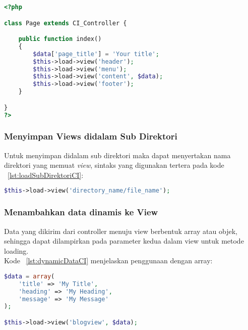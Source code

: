 \begin{lstlisting}[style=customphp, language=PHP, basicstyle=\ttfamily, frame=single, columns=fullflexible, keepspaces=true, breaklines=true, showstringspaces=false, label={lst:loadSomeViewCI}, caption=Contoh load beberapa view pada CodeIgniter.] 
<?php

class Page extends CI_Controller {

	public function index()
	{
		$data['page_title'] = 'Your title';
		$this->load->view('header');
		$this->load->view('menu');
		$this->load->view('content', $data);
		$this->load->view('footer');
	}

}
?>
\end{lstlisting}

\subsubsection{Menyimpan Views didalam Sub Direktori}
\label{ss:subdirektoriViewCI}
Untuk menyimpan didalam sub direktori maka dapat menyertakan nama direktori yang memuat \textit{view}, sintaks yang digunakan tertera pada kode ~\ref{lst:loadSubDirektoriCI}:
\begin{lstlisting}[style=customphp, language=PHP, basicstyle=\ttfamily, frame=single, columns=fullflexible, keepspaces=true, breaklines=true, showstringspaces=false, label={lst:loadSubDirektoriCI}, caption=Struktur penyimpanan views dalam sub direktori.] 
$this->load->view('directory_name/file_name');
\end{lstlisting}

\subsubsection{Menambahkan data dinamis ke View}
\label{ss:dinamisViewCI}
Data yang dikirim dari controller menuju view berbentuk array atau objek, sehingga dapat dilampirkan pada parameter kedua dalam view untuk metode loading.\\



\noindent Kode ~\ref{lst:dynamicDataCI} menjelaskan penggunaan dengan array:
\begin{lstlisting}[style=customphp, language=PHP, basicstyle=\ttfamily, frame=single, columns=fullflexible, keepspaces=true, breaklines=true, showstringspaces=false, label={lst:dynamicDataCI}, caption=Struktur data dinamis.] 
$data = array(
	'title' => 'My Title',
	'heading' => 'My Heading',
	'message' => 'My Message'
);

$this->load->view('blogview', $data);
\end{lstlisting}


